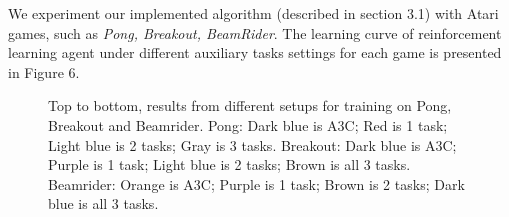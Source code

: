 \documentclass[12pt,twocolumn,letterpaper]{article}
\begin{document}
We experiment our implemented algorithm (described in section 3.1) with Atari games, such as \textit{Pong, Breakout, BeamRider}. The learning curve of reinforcement learning agent under different auxiliary tasks settings for each game is presented in Figure 6. 

\begin{figure}[H]
\begin{center}
\end{center}
\begin{center}
\end{center}
\begin{center}
\end{center}
	\caption{Top to bottom, results from different setups for training on Pong, Breakout and Beamrider. Pong: Dark blue is A3C; Red is 1 task; Light blue is 2 tasks; Gray is 3 tasks. Breakout: Dark blue is A3C; Purple is 1 task; Light blue is 2 tasks; Brown is all 3 tasks. Beamrider: Orange is A3C; Purple is 1 task; Brown is 2 tasks; Dark blue is all 3 tasks.}
\label{fig:long}
\label{fig:onecol}
\end{figure}
\end{document}
